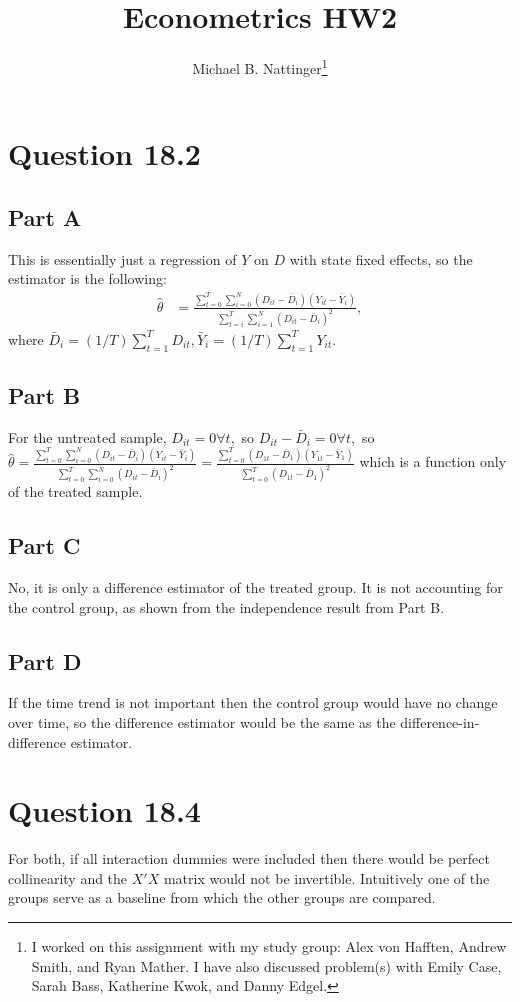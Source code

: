 \documentclass[11pt]{article} %
\title{Econometrics HW2}
\author{Michael B. Nattinger\footnote{I worked on this assignment with my study group: Alex von Hafften, Andrew Smith, and Ryan Mather. I have also discussed problem(s) with Emily Case, Sarah Bass, Katherine Kwok, and Danny Edgel.}}
\begin{document}
\maketitle

\section{Question 18.2}
\subsection{Part A}
This is essentially just a regression of $Y$ on $D$ with state fixed effects, so the estimator is the following:
\begin{align*}
\hat{\theta} &= \frac{\sum_{t=0}^{T}\sum_{i=0}^{N}(D_{it} - \bar{D}_{i})(Y_{it} - \bar{Y}_{i})}{\sum_{t=i}^{T}\sum_{i=1}^{N}(D_{it} - \bar{D}_{i})^2},
\end{align*}
where $\bar{D}_i = (1/T)\sum_{t=1}^T D_{it},\bar{Y}_i = (1/T)\sum_{t=1}^T Y_{it}$.
\subsection{Part B}
For the untreated sample, $D_{it} = 0 \forall t,$ so $D_{it} - \bar{D}_i = 0 \forall t,$ so $\hat{\theta} =  \frac{\sum_{t=0}^{T}\sum_{i=0}^{N}(D_{it} - \bar{D}_{i})(Y_{it} - \bar{Y}_{i})}{\sum_{t=0}^{T}\sum_{i=0}^{N}(D_{it} - \bar{D}_{i})^2} =  \frac{\sum_{t=0}^{T}(D_{1t} - \bar{D}_{1})(Y_{1t} - \bar{Y}_{1})}{\sum_{t=0}^{T}(D_{1t} - \bar{D}_{1})^2}$ which is a function only of the treated sample.
\subsection{Part C}
No, it is only a difference estimator of the treated group. It is not accounting for the control group, as shown from the independence result from Part B.
\subsection{Part D}
If the time trend is not important then the control group would have no change over time, so the difference estimator would be the same as the difference-in-difference estimator.
\section{Question 18.4}
For both, if all interaction dummies were included then there would be perfect collinearity and the $X'X$ matrix would not be invertible. Intuitively one of the groups serve as a baseline from which the other groups are compared.
\end{document}
